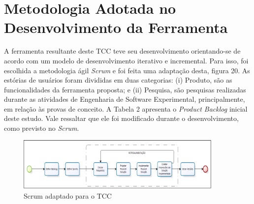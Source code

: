 \section{Metodologia Adotada no Desenvolvimento da Ferramenta}

A ferramenta resultante deste TCC teve seu desenvolvimento orientando-se de acordo com um modelo de desenvolvimento iterativo e incremental. Para isso, foi escolhida a metodologia ágil  \textit{Scrum} e foi feita uma adaptação desta, figura 20. As estórias de usuários foram divididas em duas categorias: (i) Produto, são as funcionalidades da ferramenta proposta; e (ii) Pesquisa, são pesquisas realizadas durante as atividades de Engenharia de Software Experimental, principalmente, em relação às provas de conceito. A Tabela 2 apresenta o \textit{Product Backlog} inicial deste estudo. Vale ressaltar que ele foi modificado durante o desenvolvimento, como previsto no \textit{Scrum}.

\begin{figure}[h!]
\centering
\label{f16}
\includegraphics[width=0.9\textwidth]{figuras/f28}
\caption{Scrum adaptado para o TCC}
\end{figure}
\FloatBarrier


